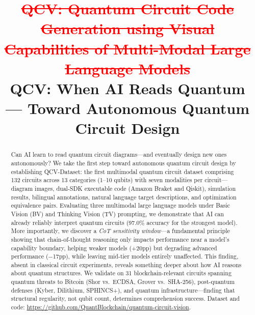 \documentclass[conference]{IEEEtran}
\begin{document}
\title{\textcolor{red}{\sout{QCV: Quantum Circuit Code Generation using Visual Capabilities of Multi-Modal Large Language Models}}\\[6pt]
QCV: When AI Reads Quantum --- Toward Autonomous Quantum Circuit Design}

\author{
\and
{}
\and
{}
}

\maketitle

\begin{abstract}
Can AI learn to read quantum circuit diagrams---and eventually design new ones autonomously?  We take the first step toward autonomous quantum circuit design by establishing QCV-Dataset: the first multimodal quantum circuit dataset comprising 132 circuits across 13 categories (1--10 qubits) with seven modalities per circuit---diagram images, dual-SDK executable code (Amazon Braket and Qiskit), simulation results, bilingual annotations, natural language target descriptions, and optimization equivalence pairs. Evaluating three multimodal large language models under Basic Vision (BV) and Thinking Vision (TV) prompting, we demonstrate that AI can already reliably interpret quantum circuits (97.0\% accuracy for the strongest model). More importantly, we discover a \emph{CoT sensitivity window}---a fundamental principle showing that chain-of-thought reasoning only impacts performance near a model's capability boundary, helping weaker models (+20pp) but degrading advanced performance ($-$17pp), while leaving mid-tier models entirely unaffected. This finding, absent in classical circuit experiments, reveals something deeper about how AI reasons about quantum structures. We validate on 31 blockchain-relevant circuits spanning quantum threats to Bitcoin (Shor vs.\ ECDSA, Grover vs.\ SHA-256), post-quantum defenses (Kyber, Dilithium, SPHINCS+), and quantum infrastructure---finding that structural regularity, not qubit count, determines comprehension success. Dataset and code: \url{https://github.com/QuantBlockchain/quantum-circuit-vision}.
\end{abstract}
\end{document}
